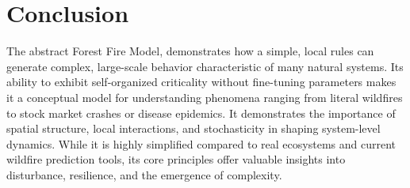 \documentclass{article}
\begin{document}
\section{Conclusion}
The abstract Forest Fire Model, demonstrates  how a simple, local rules can generate complex, large-scale behavior characteristic of many natural systems. Its ability to exhibit self-organized criticality without fine-tuning parameters makes it a conceptual model for understanding phenomena ranging from literal wildfires to stock market crashes or disease epidemics. It demonstrates the importance of spatial structure, local interactions, and stochasticity in shaping system-level dynamics. While it is highly simplified compared to real ecosystems and current wildfire prediction tools, its core principles offer valuable insights into disturbance, resilience, and the emergence of complexity. 

\printbibliography %
\end{document}
